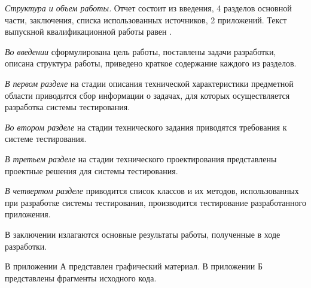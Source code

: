 \emph{Структура и объем работы.} Отчет состоит из введения, 4 разделов основной части, заключения, списка использованных источников, 2 приложений. Текст выпускной квалификационной работы равен .

\emph{Во введении} сформулирована цель работы, поставлены задачи разработки, описана структура работы, приведено краткое содержание каждого из разделов.

\emph{В первом разделе} на стадии описания технической характеристики предметной области приводится сбор информации о задачах, для которых осуществляется разработка системы тестирования.

\emph{Во втором разделе} на стадии технического задания приводятся требования к системе тестирования.

\emph{В третьем разделе} на стадии технического проектирования представлены проектные решения для системы тестирования.

\emph{В четвертом разделе} приводится список классов и их методов, использованных при разработке системы тестирования, производится тестирование разработанного приложения.

В заключении излагаются основные результаты работы, полученные в ходе разработки.

В приложении А представлен графический материал.
В приложении Б представлены фрагменты исходного кода. 
